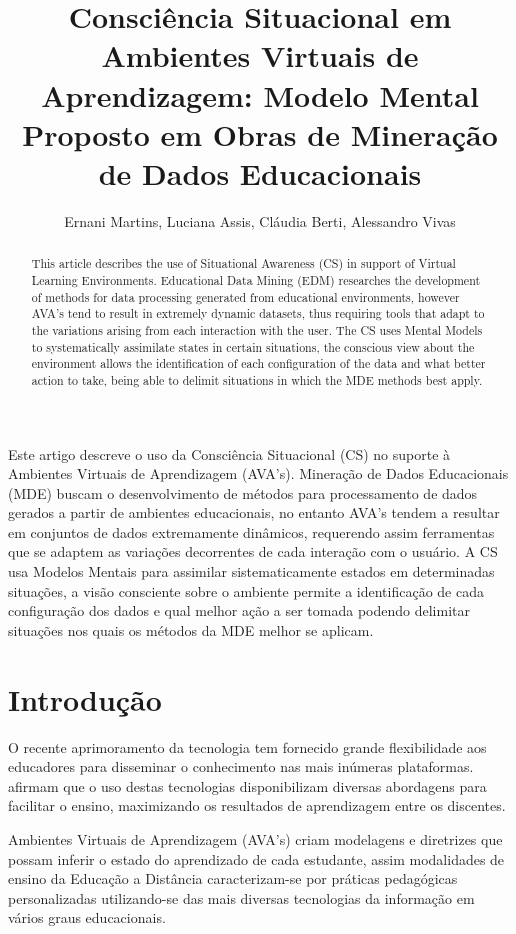 \documentclass[12pt]{article}
\title{Consciência Situacional em Ambientes Virtuais de Aprendizagem:
	Modelo Mental Proposto em Obras de Mineração de Dados Educacionais }
\author{Ernani Martins\inst{1}, Luciana Assis\inst{2}, Cláudia Berti\inst{2}, Alessandro Vivas\inst{2} }
\begin{document}
 

\maketitle

\begin{abstract}
  This article describes the use of Situational Awareness (CS) in support of Virtual Learning Environments. Educational Data Mining (EDM) researches the development of methods for data processing generated from educational environments, however AVA's tend to result in extremely dynamic datasets, thus requiring tools that adapt to the variations arising from each interaction with the user. The CS uses Mental Models to systematically assimilate states in certain situations, the conscious view about the environment allows the identification of each configuration of the data and what better action to take, being able to delimit situations in which the MDE methods best apply.
\end{abstract}
     
\begin{resumo} 
  Este artigo descreve o uso da Consciência Situacional (CS) no suporte à Ambientes Virtuais de Aprendizagem (AVA's). Mineração de Dados Educacionais (MDE) buscam o desenvolvimento de métodos para processamento de dados gerados a partir de ambientes educacionais, no entanto AVA's tendem a resultar em conjuntos de dados extremamente dinâmicos, requerendo assim ferramentas que se adaptem as variações decorrentes de cada interação com o usuário. A CS usa Modelos Mentais para assimilar sistematicamente estados em determinadas situações, a visão consciente sobre o ambiente permite a identificação de cada configuração dos dados e qual melhor ação a ser tomada podendo delimitar situações nos quais os métodos da MDE melhor se aplicam.
\end{resumo}


\section{Introdução} 

O recente aprimoramento da tecnologia tem fornecido grande flexibilidade aos educadores para disseminar o conhecimento nas mais inúmeras plataformas. \cite{Ahmad_Shamsuddin_2010} afirmam que o uso destas tecnologias disponibilizam diversas abordagens para facilitar o ensino, maximizando os resultados de aprendizagem entre os discentes.

Ambientes Virtuais de Aprendizagem (AVA's) criam modelagens e diretrizes que possam inferir o estado do aprendizado de cada estudante, assim modalidades de ensino da Educação a Distância caracterizam-se por práticas pedagógicas personalizadas utilizando-se das mais diversas tecnologias da informação em vários graus educacionais. 
\end{document}
